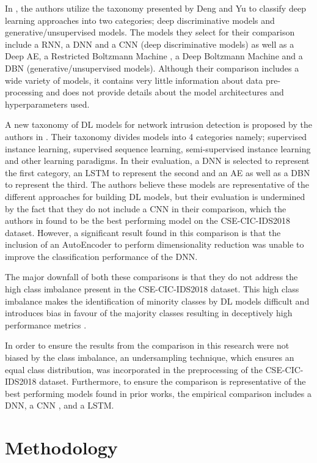 \documentclass[conference]{IEEEtran}
\begin{document}
In \cite{b13}, the authors utilize the taxonomy presented by Deng and Yu \cite{b23} to classify deep learning approaches into two categories; deep discriminative models and generative/unsupervised models. The models they select for their comparison include a RNN, a DNN and a CNN (deep discriminative models) as well as a Deep AE, a Restricted Boltzmann Machine , a Deep Boltzmann Machine and a DBN (generative/unsupervised models). Although their comparison includes a wide variety of models, it contains very little information about data pre-processing and does not provide details about the model architectures and hyperparameters used.

A new taxonomy of DL models for network intrusion detection is proposed by the authors in \cite{b14}. Their taxonomy divides models into 4 categories namely; supervised instance learning, supervised sequence learning, semi-supervised instance learning and other learning paradigms. In their evaluation, a DNN is selected to represent the first category, an LSTM to represent the second and an AE as well as a DBN to represent the third. The authors believe these models are representative of the different approaches for building DL models, but their evaluation is undermined by the fact that they do not include a CNN in their comparison, which the authors in \cite{b13} found to be the best performing model on the CSE-CIC-IDS2018 dataset. However, a significant result found in this comparison is that the inclusion of an AutoEncoder
to perform dimensionality reduction was unable to improve the classification performance of the DNN. 

The major downfall of both these comparisons is that they do not address the high class imbalance present in the CSE-CIC-IDS2018 dataset. This high class imbalance makes the identification of minority classes by DL models difficult and introduces bias in favour of the majority classes resulting in deceptively high performance metrics \cite{b17}. 

In order to ensure the results from the comparison in this research were not biased by the class imbalance, an undersampling technique, which ensures an equal class distribution, was incorporated in the preprocessing of the CSE-CIC-IDS2018 dataset. Furthermore, to ensure the comparison is representative of the best performing models found in prior works, the empirical comparison includes a DNN, a CNN , and a LSTM.  


\section{Methodology}
\end{document}

